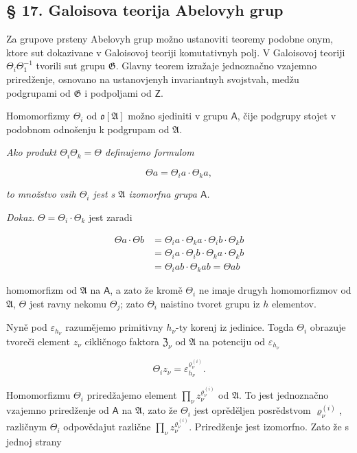 \documentclass[11pt]{article}
\begin{document}
\subsection*{§ 17. Galoisova teorija Abelovyh grup}\label{die-galoissche-theorie-abelscher-gruppen}

Za grupove prsteny Abelovyh grup možno ustanoviti teoremy podobne onym, ktore sut dokazivane v Galoisovoj teoriji komutativnyh polj. V Galoisovoj teoriji \(\Theta_i\Theta_1^{-1}\) tvorili sut grupu \(\mathfrak{G}\). Glavny teorem izražaje jednoznačno vzajemno priredženje, osnovano na ustanovjenyh invariantnyh svojstvah, medžu podgrupami od \(\mathfrak{G}\) i podpoljami od \(\mathsf{Z}\).

Homomorfizmy \(\Theta_i\) od \(\mathfrak{o}[\mathfrak{A}]\) možno sjediniti v grupu \(\mathsf A\), čije podgrupy stojet v podobnom odnošenju k podgrupam od \(\mathfrak{A}\).

\emph{Ako produkt \(\Theta_i \Theta_k = \Theta\) definujemo formulom}

\[\Theta a = \Theta_i a \cdot \Theta_k a,\]

\emph{to množstvo vsih \(\Theta_i\) jest s \(\mathfrak A\) izomorfna grupa \(\mathsf A\).}

\emph{Dokaz.} \(\Theta = \Theta_i \cdot \Theta_k\) jest zaradi

\[\begin{aligned}
\Theta a \cdot \Theta b &= \Theta_i a \cdot \Theta_k a \cdot \Theta_i b \cdot \Theta_k b \\
&= \Theta_i a \cdot \Theta_i b \cdot \Theta_k a \cdot \Theta_k b \\
&= \Theta_i a b \cdot \Theta_k a b = \Theta a b
\end{aligned}\]

homomorfizm od \(\mathfrak A\) na \(\mathsf A\), a zato že kromě \(\Theta_i\) ne imaje drugyh homomorfizmov od \(\mathfrak A\), \(\Theta\) jest ravny nekomu \(\Theta_j\); zato \(\Theta_i\) naistino tvoret grupu iz \(h\) elementov.

Nyně pod \(\varepsilon_{h_\nu}\) razumějemo primitivny \(h_\nu\)-ty korenj iz jedinice. Togda \(\Theta_i\) obrazuje tvoreči element \(z_\nu\) cikličnogo faktora \(\mathfrak Z_\nu\) od \(\mathfrak A\) na potenciju od \(\varepsilon_{h_\nu}\)

\[
\Theta_i z_\nu=\varepsilon_{h_\nu}^{\varrho_\nu^{(i)}}.
\]

Homomorfizmu \(\Theta_i\) priredžajemo element \(\prod_\nu z_\nu^{\varrho_\nu^{(i)}}\) od \(\mathfrak A\). To jest jednoznačno vzajemno priredženje od \(\mathsf A\) na \(\mathfrak A\), zato že \(\Theta_i\) jest oprěděljen posrědstvom \(\varrho_\nu^{(i)}\), različnym \(\Theta_i\) odpovědajut različne \(\prod_\nu z_\nu^{\varrho_\nu^{(i)}}\). Priredženje jest izomorfno. Zato že s jednoj strany
\end{document}
